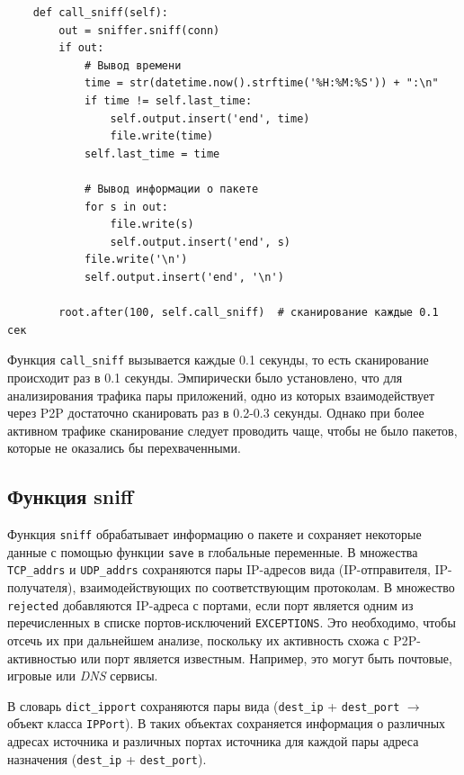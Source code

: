 \documentclass[bachelor, och, coursework]{SCWorks}
\begin{document}
\begin{verbatim}
    def call_sniff(self):
        out = sniffer.sniff(conn)
        if out:
            # Вывод времени
            time = str(datetime.now().strftime('%H:%M:%S')) + ":\n"
            if time != self.last_time:
                self.output.insert('end', time)
                file.write(time)
            self.last_time = time

            # Вывод информации о пакете
            for s in out:
                file.write(s)
                self.output.insert('end', s)
            file.write('\n')
            self.output.insert('end', '\n')

        root.after(100, self.call_sniff)  # сканирование каждые 0.1 сек
\end{verbatim}

Функция \texttt{call_sniff} вызывается каждые 0.1 секунды, то есть сканирование происходит раз в 0.1 секунды.
Эмпирически было установлено, что для анализирования трафика пары приложений, одно из которых взаимодействует через P2P достаточно сканировать раз в 0.2-0.3 секунды. Однако при более активном трафике сканирование следует проводить чаще, чтобы не было пакетов, которые не оказались бы перехваченными.

\subsection{Функция sniff}
Функция \texttt{sniff} обрабатывает информацию о пакете и сохраняет некоторые данные с помощью функции \texttt{save} в глобальные переменные.
В множества \texttt{TCP_addrs} и \texttt{UDP_addrs} сохраняются пары IP-адресов вида (IP-отправителя, IP-получателя), взаимодействующих по соответствующим протоколам.
В множество \texttt{rejected} добавляются IP-адреса с портами, если порт является одним из перечисленных в списке портов-исключений \texttt{EXCEPTIONS}. 
Это необходимо, чтобы отсечь их при дальнейшем анализе, поскольку их активность схожа с P2P-активностью или порт является известным. Например, это могут быть почтовые, игровые или \textit{DNS} сервисы. 

В словарь \texttt{dict_ipport} сохраняются пары вида (\texttt{dest_ip} + \texttt{dest_port} $\to$ объект класса \texttt{IPPort}). 
В таких объектах сохраняется информация о различных адресах источника и различных портах источника для каждой пары адреса назначения (\texttt{dest_ip} + \texttt{dest_port}).
\end{document}
